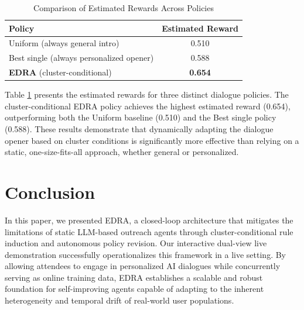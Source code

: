 \documentclass[sigconf]{acmart}
\begin{document}
\begin{table}[htbp]
\caption{Comparison of Estimated Rewards Across Policies}
\vspace{-1.3em}
\label{tab:policy_rewards}
\begin{center}
\begin{tabular*}{\columnwidth}{@{\extracolsep{\fill}}lc@{}}
\toprule
\textbf{Policy} & \textbf{Estimated Reward} \\
\midrule
Uniform (always general intro) & 0.510 \\
Best single (always personalized opener) & 0.588 \\
\textbf{EDRA} (cluster-conditional) & \textbf{0.654} \\
\bottomrule
\end{tabular*}
\end{center}
\end{table}

Table \ref{tab:policy_rewards} presents the estimated rewards for three distinct dialogue policies. The cluster-conditional EDRA policy achieves the highest estimated reward (0.654), outperforming both the Uniform baseline (0.510) and the Best single policy (0.588). These results demonstrate that dynamically adapting the dialogue opener based on cluster conditions is significantly more effective than relying on a static, one-size-fits-all approach, whether general or personalized.

\section{Conclusion}
In this paper, we presented EDRA, a closed-loop architecture that mitigates the limitations of static LLM-based outreach agents through cluster-conditional rule induction and autonomous policy revision. Our interactive dual-view live demonstration successfully operationalizes this framework in a live setting. By allowing attendees to engage in personalized AI dialogues while concurrently serving as online training data, EDRA establishes a scalable and robust foundation for self-improving agents capable of adapting to the inherent heterogeneity and temporal drift of real-world user populations.

\balance


\end{document}
